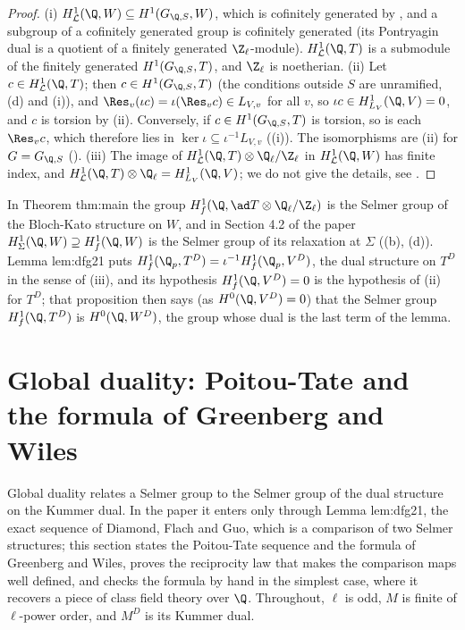 \begin{proof}
(i) $H^1_{\mathcal L}(\Q,W)\subseteq H^1(G_{\Q,S},W)$, which is cofinitely generated by , and a subgroup of a cofinitely generated group is
cofinitely generated (its Pontryagin dual is a quotient of a finitely generated $\Z_\ell$-module). $H^1_{\mathcal L}(\Q,T)$ is a submodule of the finitely generated
$H^1(G_{\Q,S},T)$, and $\Z_\ell$ is noetherian.
(ii) Let $c\in H^1_{\mathcal L}(\Q,T)$; then $c\in H^1(G_{\Q,S},T)$ (the conditions outside $S$ are unramified, (d) and
(i)), and $\Res_v(\iota c)=\iota(\Res_vc)\in L_{V,v}$ for all $v$, so $\iota c\in H^1_{L_V}(\Q,V)=0$, and $c$ is torsion by
(ii). Conversely, if $c\in H^1(G_{\Q,S},T)$ is torsion, so is each $\Res_vc$, which therefore lies in $\ker\iota\subseteq\iota^{-1}L_{V,v}$
((i)). The isomorphisms are (ii) for $G=G_{\Q,S}$ ().
(iii) The image of $H^1_{\mathcal L}(\Q,T)\otimes\Q_\ell/\Z_\ell$ in $H^1_{\mathcal L}(\Q,W)$ has finite index, and $H^1_{\mathcal L}(\Q,T)\otimes\Q_\ell=H^1_{L_V}(\Q,V)$; we do not give the details,
see \cite[Section 1.5]{Rubin}.
\end{proof}

\begin{paperlink}\label{pl:galcoh:structures}
In Theorem thm:main the group $H^1_f(\Q,\ad T\otimes\Q_\ell/\Z_\ell)$ is the Selmer group of the Bloch-Kato structure on $W$, and in Section 4.2 of the paper
$H^1_\Sigma(\Q,W)\supseteq H^1_f(\Q,W)$ is the Selmer group of its relaxation at $\Sigma$ ((b), (d)). Lemma lem:dfg21 puts
$H^1_f(\Q_p,T^D)=\iota^{-1}H^1_f(\Q_p,V^D)$, the dual structure on $T^D$ in the sense of (iii), and its hypothesis $H^1_f(\Q,V^D)=0$ is
the hypothesis of (ii) for $T^D$; that proposition then says (as $H^0(\Q,V^D)=0$) that the Selmer group $H^1_f(\Q,T^D)$ is $H^0(\Q,W^D)$, the group whose dual is
the last term of the lemma.
\end{paperlink}
\section[Global duality]{Global duality: Poitou-Tate and the formula of Greenberg and Wiles}\label{sec:galcoh:global-duality}

Global duality relates a Selmer group to the Selmer group of the dual structure on the Kummer dual. In the paper it enters only through Lemma lem:dfg21, the
exact sequence of Diamond, Flach and Guo, which is a comparison of two Selmer structures; this section states the Poitou-Tate sequence and the formula of Greenberg
and Wiles, proves the reciprocity law that makes the comparison maps well defined, and checks the formula by hand in the simplest case, where it recovers a
piece of class field theory over $\Q$. Throughout, $\ell$ is odd, $M$ is finite of $\ell$-power order, and $M^D$ is its Kummer dual.

